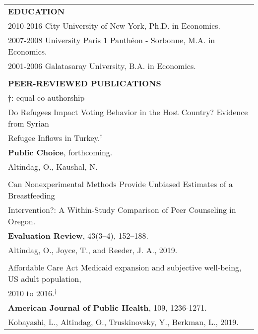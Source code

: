 \documentclass[12 pt]{article}
\begin{document}
\begin{longtable}{ccccc}
\\


\multicolumn{5}{l}{\textbf{EDUCATION}}\\[2 pt]
  \multicolumn{4}{l}{2010\phantom{7}-\phantom{8}2016 \phantom{0000}City University of New York, Ph.D. in Economics.}     \\
    \multicolumn{4}{l}{2007\phantom{1}-\phantom{6}2008 \phantom{000..}University Paris 1 Panth\'{e}on - Sorbonne, M.A. in Economics.} \\
\multicolumn{4}{l}{2001\phantom{1}-\phantom{0}2006 \phantom{000.} Galatasaray University,  B.A. in Economics.}  \\
\\

\multicolumn{5}{l}{\textbf{PEER-REVIEWED PUBLICATIONS }} \\ 
 \multicolumn{5}{l}{\footnotesize{$\dagger$: equal co-authorship}} \\[4 pt]



   \multicolumn{5}{l}{Do Refugees Impact Voting Behavior in the Host Country? Evidence from Syrian} \\
    \multicolumn{5}{l}{Refugee Inflows in Turkey.$^{\dagger}$} \\
     \multicolumn{5}{l}{\textbf{Public Choice}, forthcoming.} \\  
 \multicolumn{5}{l}{Altindag, O., Kaushal, N.} \\
\\

   \multicolumn{5}{l}{Can Nonexperimental Methods Provide Unbiased Estimates of a Breastfeeding} \\
  \multicolumn{5}{l}{Intervention?: A Within-Study Comparison of Peer Counseling in Oregon. } \\
    \multicolumn{5}{l}{\textbf{Evaluation Review}, 43(3–4), 152–188.} \\
 \multicolumn{5}{l}{Altindag, O., Joyce, T., and Reeder, J. A., 2019.} \\



 \\ 

  \multicolumn{5}{l}{Affordable Care Act Medicaid expansion and subjective well-being, US adult population, } \\
    \multicolumn{5}{l}{2010 to 2016.$^{\dagger}$} \\
   \multicolumn{5}{l}{\textbf{American Journal of Public Health}, 109, 1236-1271.} \\
   \multicolumn{5}{l}{Kobayashi, L., Altindag, O., Truskinovsky, Y., Berkman, L., 2019.}  \\


\end{longtable}
\end{document}
